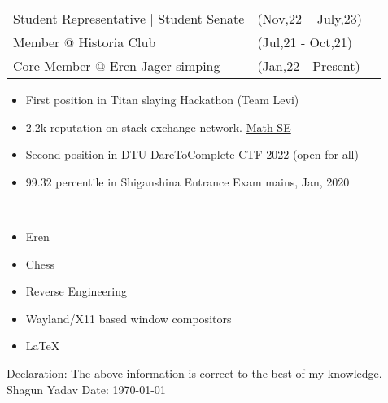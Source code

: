 \documentclass[10pt]{extarticle}
\newcommand{\yourname}{Shagun Yadav}%
\begin{document}
\vspace{0pt}
\begin{contained}
\begin{longtable}{p{}p{}p{}}
    Student Representative | Student Senate & (Nov,22 – July,23)\\
    Member @ Historia Club & (Jul,21 - Oct,21)\\
    Core Member @ Eren Jager simping & (Jan,22 - Present)\\
\end{longtable}
\vspace{0pt}
\end{contained}
\begin{contained}
\vspace{0pt}
\begin{itemize}
    \setlength\itemsep{0.5pt}
    \item First position in Titan slaying Hackathon (Team Levi)
    \item 2.2k reputation on stack-exchange network. \href{https://math.stackexchange.com/users/811225}{\color{red!70} Math SE}
    \item Second position in DTU DareToComplete CTF 2022 (open for all)
    \item 99.32 percentile in Shiganshina Entrance Exam mains, Jan, 2020
\end{itemize}
\vspace{0pt}
\end{contained}
\begin{contained}\\
\begin{itemize}
    \setlength\itemsep{0.5pt}
    \item Eren
    \item Chess
    \item Reverse Engineering
    \item Wayland/X11 based window compositors
    \item \LaTeX
\end{itemize}
\end{contained}
Declaration: The above information is correct to the best of my knowledge.\newline
\yourname\newline
Date: \today
\end{document}
